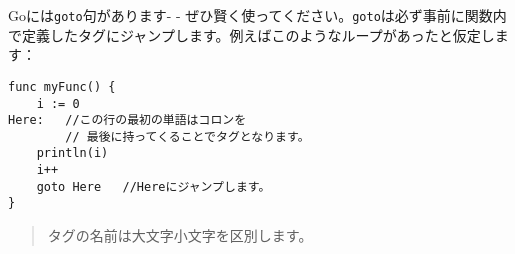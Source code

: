 Goには\texttt{goto}句があります- - ぜひ賢く使ってください。\texttt{goto}は必ず事前に関数内で定義したタグにジャンプします。例えばこのようなループがあったと仮定します：

\begin{lstlisting}[numbers=none]
func myFunc() {
    i := 0
Here:   //この行の最初の単語はコロンを
        // 最後に持ってくることでタグとなります。
    println(i)
    i++
    goto Here   //Hereにジャンプします。
}
\end{lstlisting}

\begin{quote}
タグの名前は大文字小文字を区別します。
\end{quote}

